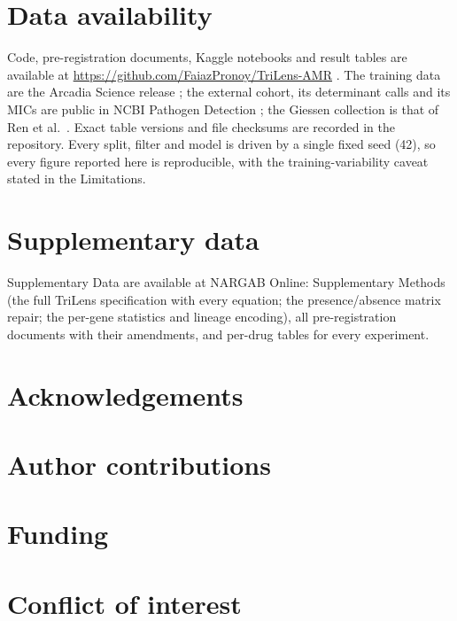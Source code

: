\section*{Data availability}
Code, pre-registration documents, Kaggle notebooks and result tables are available at
\url{https://github.com/FaiazPronoy/TriLens-AMR} . The training data are the Arcadia Science release
\cite{arcadia2024dataset,bell2025arcadia}; the external cohort, its determinant calls and its MICs
are public in NCBI Pathogen Detection \cite{ncbi_pathogen_detection}; the Giessen collection is that
of Ren et al.\ \cite{ren2022giessen}. Exact table versions and file checksums are recorded in the
repository. Every split, filter and model is driven by a single fixed seed (42), so every figure
reported here is reproducible, with the training-variability caveat stated in the Limitations.

\section*{Supplementary data}
Supplementary Data are available at NARGAB Online: Supplementary Methods (the full TriLens
specification with every equation; the presence/absence matrix repair; the per-gene statistics and
lineage encoding), all pre-registration documents with their amendments, and per-drug tables for
every experiment.

\section*{Acknowledgements}
\todo{}

\section*{Author contributions}

\section*{Funding}
\todo{}

\section*{Conflict of interest}
